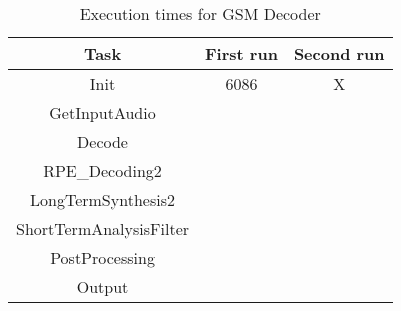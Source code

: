 \documentclass[12pt]{article}
\begin{document}
\begin{table}[h]
  \centering
  \begin{tabular}{c c c}
    \hline
    Task & First run & Second run \\
    \hline
    Init & 6086 & X \\
    GetInputAudio & & \\
    Decode & & \\
    RPE_Decoding2 & & \\
    LongTermSynthesis2 & & \\
    ShortTermAnalysisFilter & & \\
    PostProcessing & & \\
    Output & & \\
  \end{tabular}
  \caption{Execution times for GSM Decoder}
\end{table}
\end{document}
